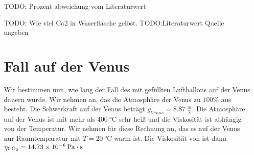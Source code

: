 \documentclass{article}
\begin{document}
        TODO: Prozent abweichung vom Literaturwert

        TODO: Wie viel Co2 in Waserflasche gelöst.
        TODO:Literaturwert Quelle angeben

    \section{Fall auf der Venus}
        Wir bestimmen nun, wie lang der Fall des mit  gefüllten Luftballons auf der Venus dauern würde. Wir nehmen an,
        das die Atmosphäre der Venus zu \( 100\% \) aus  besteht. Die Schwerkraft auf der Venus beträgt \(g_{Venus} = \SI{8.87}{\frac{m}{s}}\).
        Die Atmosphäre auf der Venus ist mit mehr als \(\SI{400}{\celsius}\) sehr heiß und die Viskosität ist abhängig von der Temperatur.
        Wir nehmen für diese Rechnung an, das es auf der Venus nur Raumtemparatur mit \(T = \SI{20}{\celsius}\) warm ist.
        Die Viskosität von  ist dann \( \eta_{\ce{CO2}} = \SI{14.73e-6}{\pascal\cdot\second} \)
\end{document}
